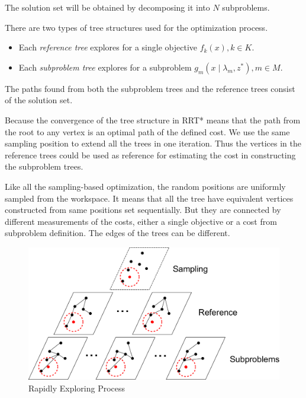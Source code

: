\documentclass[conference]{IEEEtran}
\theoremstyle{definition}
\begin{document}
The solution set will be obtained by decomposing it into $ N $ subproblems.

There are two types of tree structures used for the optimization process.
\begin{itemize}
\item Each \emph{reference tree} explores for a single objective $ f_{k} (x), k \in K $. 
\item Each \emph{subproblem tree} explores for a subproblem $ g_{m} ( x \mid \lambda_{m} , z^{*} ) , m \in M $.
\end{itemize}
The paths found from both the subproblem trees and the reference trees consist of the solution set.


Because the convergence of the tree structure in RRT* means that the path from the root to any vertex is an optimal path of the defined cost.
We use the same sampling position to extend all the trees in one iteration.
Thus the vertices in the reference trees could be used as reference for estimating the cost in constructing the subproblem trees.

Like all the sampling-based optimization, the random positions are uniformly sampled from the workspace.
It means that all the tree have equivalent vertices constructed from same positions set sequentially.
But they are connected by different measurements of the costs, either a single objective or a cost from subproblem definition.
The edges of the trees can be different.

\begin{figure}[H]
\centering
\includegraphics[width=0.9\linewidth]{./fig/MORRTstar}
\caption{Rapidly Exploring Process}
\label{fig:MORRTstar}
\end{figure}
\end{document}
